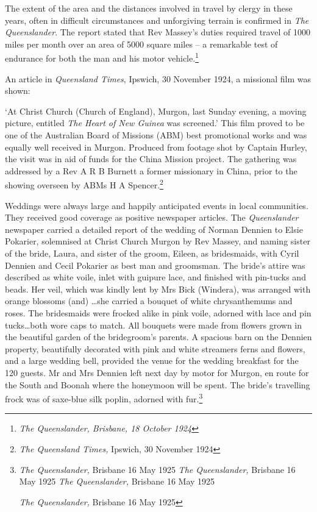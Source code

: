 The extent of the area and the distances involved in travel by clergy in these years, often in difficult circumstances and unforgiving terrain is confirmed in \emph{The Queenslander}. The report stated that Rev Massey's duties required travel of 1000 miles per month over an area of 5000 square miles -- a remarkable test of endurance for both the man and his motor vehicle.\footnote{\emph{The Queenslander, Brisbane, 18 October 1924}}

An article in \emph{Queensland Times}, Ipswich, 30 November 1924, a missional film was shown:

`At Christ Church (Church of England), Murgon, last Sunday evening, a moving picture, entitled \emph{The Heart of New Guinea} was screened.' This film proved to be one of the Australian Board of Missions (ABM) best promotional works and was equally well received in Murgon. Produced from footage shot by Captain Hurley, the visit was in aid of funds for the China Mission project\emph{.} The gathering was addressed by a Rev A R B Burnett a former missionary in China, prior to the showing overseen by ABMs H A Spencer.\footnote{\emph{The Queensland Times,} Ipswich, 30 November 1924}

Weddings were always large and happily anticipated events in local communities. They received good coverage as positive newspaper articles. The \emph{Queenslander} newspaper carried a detailed report of the wedding of Norman Dennien to Elsie Pokarier, solemnised at Christ Church Murgon by Rev Massey, and naming sister of the bride, Laura, and sister of the groom, Eileen, as bridesmaids, with Cyril Dennien and Cecil Pokarier as best man and groomsman. The bride's attire was described as white voile, inlet with guipure lace, and finished with pin-tucks and beads. Her veil, which was kindly lent by Mrs Bick (Windera), was arranged with orange blossoms (and) \ldots she carried a bouquet of white chrysanthemums and roses. The bridesmaids were frocked alike in pink voile, adorned with lace and pin tucks\ldots both wore caps to match. All bouquets were made from flowers grown in the beautiful garden of the bridegroom's parents. A spacious barn on the Dennien property, beautifully decorated with pink and white streamers ferns and flowers, and a large wedding bell, provided the venue for the wedding breakfast for the 120 guests. Mr and Mrs Dennien left next day by motor for Murgon, en route for the South and Boonah where the honeymoon will be spent. The bride's travelling frock was of saxe-blue silk poplin, adorned with fur.\footnote{\emph{The Queenslander,} Brisbane 16 May 1925 \emph{The Queenslander,} Brisbane 16 May 1925 \emph{The Queenslander,} Brisbane 16 May 1925

  \emph{The Queenslander,} Brisbane 16 May 1925}

